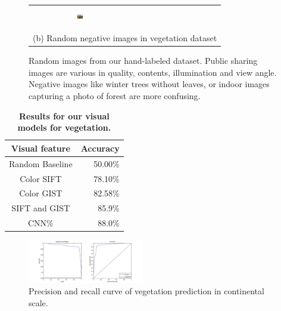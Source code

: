 \begin{figure}[th]
{{\begin{center}
\begin{tabular}{@{}c@{\,\,\,}c@{\,\,\,}c@{\,\,\,}c@{\,\,\,}c@{\,\,\,}}
\includegraphics[width=0.06\textwidth, height=0.35in]{imggrid/datasetnega/10.jpg} \\
\multicolumn{5}{c}{(b) Random negative images in vegetation dataset} \\
\end{tabular}
\end{center}
}}
\vspace{-6pt}
\caption{Random images from our hand-labeled dataset. Public sharing images are various in quality, contents, illumination and view angle.
Negative images like winter trees without leaves, or indoor images capturing a photo of forest are more confusing.}
\label{fig:dataset}
\end{figure}

\begin{table}\centering
\caption {\textbf{Results for our visual models for vegetation.}}
\label{tab:veg_img_classifier} 
\tiny
\begin{tabular}{@{}cr@{}}\toprule
Visual feature &  Accuracy\\\midrule
Random Baseline & 50.00\%\\
Color SIFT & 78.10\%\\
Color GIST & 82.58\% \\
SIFT and GIST& 85.9\% \\
CNN\% &  88.0\%\\
\bottomrule
\end{tabular}
\end{table}

\begin{figure}
\begin{center}
\includegraphics[width=0.45\textwidth]{figure/curvevege.jpg}
\end{center}
\vspace{-6pt}
\addvspace{2mm}
\caption{Precision and recall curve of vegetation prediction in continental scale.}
\label{fig:curvevege}
\vspace{-6pt}
\end{figure}
\addvspace{5mm}


